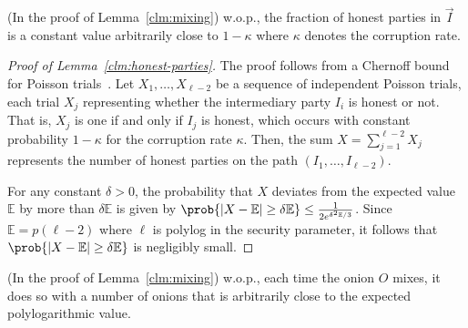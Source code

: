 \documentclass[runningheads,a4paper]{llncs}
\begin{document}
\iffalse
\begin{lemma} \label{clm:honest-parties}
(In the proof of Lemma~\ref{clm:mixing}) w.o.p., the fraction of honest parties in $\vec{I}$ is a constant value arbitrarily close to $1-\kappa$ where $\kappa$ denotes the corruption rate. 
\end{lemma}

\begin{proof}[Proof of Lemma~\ref{clm:honest-parties}]
The proof follows from a Chernoff bound for Poisson trials~\cite[Corollary 4.6]{MU05}. 
Let $X_1, \dots, X_{\ell-2}$ be a sequence of independent Poisson trials, each trial $X_j$ representing whether the intermediary party $I_i$ is honest or not. That is, $X_j$ is one if and only if $I_j$ is honest, which occurs with constant probability $1-\kappa$ for the corruption rate $\kappa$. Then, the sum $X = \sum_{j=1}^{\ell-2} X_j$ represents the number of honest parties on the path $(I_1, \dots, I_{\ell-2})$. 

For any constant $\delta > 0$, the probability that $X$ deviates from the expected value $\mathbb{E}$ by more than $\delta \mathbb{E}$ is given by %
$\prob{|X - \mathbb{E}| \ge \delta \mathbb{E}} \le \frac{1}{2 e^{\delta^2\mathbb{E}/3}}$. 
Since $\mathbb{E} = p(\ell-2)$ where $\ell$ is polylog in the security parameter, it follows that  
$\prob{|X - \mathbb{E}| \ge \delta \mathbb{E}}$ %
is negligibly small.
\end{proof}

\begin{lemma} \label{clm:ckpts-work}
(In the proof of Lemma~\ref{clm:mixing})
w.o.p., each time the onion $O$ mixes, it does so with a number of onions that is arbitrarily close to the expected polylogarithmic value. 
\end{lemma}
\end{document}

